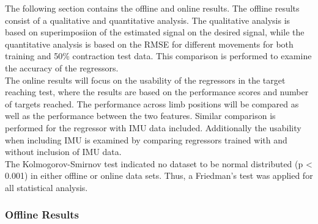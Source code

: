 \begin{multicols}{2}
The following section contains the offline and online results. The offline results consist of a qualitative and quantitative analysis. The qualitative analysis is based on superimposiion of the estimated signal on the desired signal, while the quantitative analysis is based on the RMSE for different movements for both training and 50\% contraction test data. This comparison is performed to examine the accuracy of the regressors. \\
The online results will focus on the usability of the regressors in the target reaching test, where the results are based on the performance scores and number of targets reached. The performance across limb positions will be compared as well as the performance between the two features. Similar comparison is performed for the regressor with IMU data included. Additionally the usability when including IMU is examined by comparing regressors trained with and without inclusion of IMU data. \\
The Kolmogorov-Smirnov test indicated no dataset to be normal distributed (p < 0.001) in either offline or online data sets. Thus, a Friedman's test was applied for all statistical analysis.

\end{multicols}
\subsubsection*{Offline Results}


